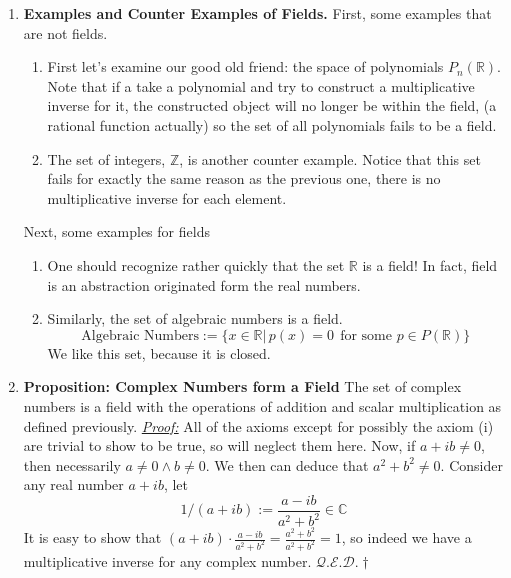 \documentclass[oneside, 12pt]{book}
\newcommand{\settag}[1]{\renewcommand{\theenumi}{#1}}
\newcommand{\R}{\mathbb{R}}
\newcommand{\complex}{\mathbb{C}}
\newcommand{\qed}{\hfill $\mathcal{Q}.\mathcal{E}.\mathcal{D}.\dagger$}
\newcommand{\tbf}[1]{\textbf{#1}}
\newcommand{\tit}[1]{\textit{#1}}
\newcommand{\proof}{\tit{\underline{Proof:}}} %
\newcommand{\para}[1]{\item \tbf{#1}}
\begin{document}
\begin{enumerate}
    \settag{5.1.4*}
    \para{Examples and Counter Examples of Fields.}
    First, some examples that are not fields.
    \begin{enumerate}
        \item First let's examine our good old friend: the space of polynomials $P_n(\R)$. 
        Note that if a take a polynomial and try to construct a multiplicative inverse for 
        it, the constructed object will no longer be within the field, (a rational function actually) 
        so the set of all polynomials fails to be a field.
        \item The set of integers, $\mathbb{Z}$, is another counter example. Notice that 
        this set fails for exactly the same reason as the previous one, there is no multiplicative 
        inverse for each element.
    \end{enumerate}
    Next, some examples for fields
    \begin{enumerate}
        \item One should recognize rather quickly that the set $\R$ is a field! In fact, 
        field is an abstraction originated form the real numbers.
        \item Similarly, the set of algebraic numbers is a field.
        \begin{equation*}
            \text{Algebraic Numbers}:= \{x\in \R|\, p(x) = 0~~\text{for some }p\in P(\R)\}
        \end{equation*}
        We like this set, because it is closed.
    \end{enumerate}
    
    \settag{5.1.5}
    \para{Proposition: Complex Numbers form a Field} The set of complex numbers is a field with the operations 
    of addition and scalar multiplication as defined previously. \newline
    \proof \newline
    All of the axioms except for possibly the axiom (i) are trivial to show to be true, so will neglect 
    them here. Now, if $a + ib\neq 0$, then necessarily $a \neq 0 \wedge b \neq 0$. We then can deduce that $a^2 + b^2 \neq 0$. Consider any real number $a + ib$, let
    \begin{equation*}
        1/(a+ib) := \frac{a-ib}{a^2+b^2} \in \complex
    \end{equation*}
    It is easy to show that $(a+ib)\cdot\frac{a-ib}{a^2+b^2} = \frac{a^2+b^2}{a^2+b^2} = 1$, so indeed we have a 
    multiplicative inverse for any complex number. \qed
    

\end{enumerate}
\end{document}
